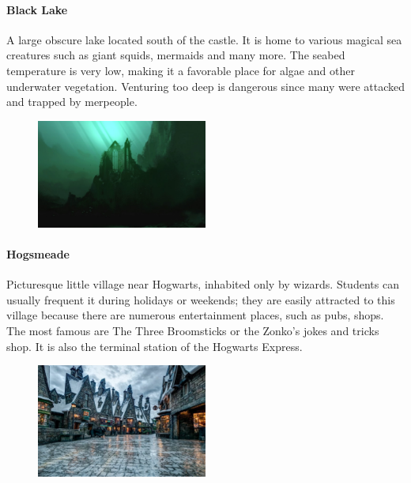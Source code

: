\paragraph{Black Lake}
A large obscure lake located south of the castle. It is home to various magical sea creatures such as giant squids, mermaids and many more. The seabed temperature is very low, making it a favorable place for algae and other underwater vegetation. Venturing too deep is dangerous since many were attacked and trapped by merpeople.
\begin{figure}
\centering
\includegraphics[max width=0.5\textwidth]{../Pictures/Locations/Hogwarts/Black_Lake_picture.jpg} 
\end{figure}

\paragraph{Hogsmeade}
Picturesque little village near Hogwarts, inhabited only by wizards. Students can usually frequent it during holidays or weekends; they are easily attracted to this village because there are numerous entertainment places, such as pubs, shops. The most famous are The Three Broomsticks or the Zonko's jokes and tricks shop. It is also the terminal station of the Hogwarts Express. 
\begin{figure}
\centering
\includegraphics[max width=0.5\textwidth]{../Pictures/Locations/Hogsmeade_picture.jpg} 
\end{figure}


